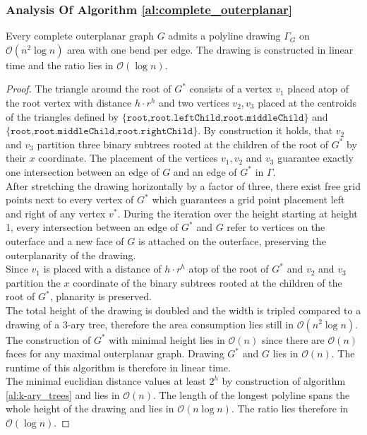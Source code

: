 
\subsubsection{Analysis Of Algorithm \ref{al:complete_outerplanar}}

\begin{lemma}
	Every complete outerplanar graph $G$ admits a polyline drawing $\Gamma_G$ on $\mathcal{O}(n^2 \log n)$ area with one bend per edge. The drawing is constructed in linear time and the ratio lies in $\mathcal{O}(\log n)$.
\end{lemma}

\begin{proof}
The triangle around the root of $G^*$ consists of a vertex $v_1$ placed atop of the root vertex with distance $h\cdot r^h$ and two vertices $v_2,v_3$ placed at the centroids of the triangles defined by $\{\texttt{root,root.leftChild,root.middleChild}\}$ and $\{\texttt{root,root.middleChild,root.rightChild}\}$. By construction it holds, that $v_2$ and $v_3$ partition three binary subtrees rooted at the children of the root of $G^*$ by their $x$ coordinate. The placement of the vertices $v_1,v_2$ and $v_3$ guarantee exactly one intersection between an edge of $G$ and an edge of $G^*$ in $\Gamma$.\\
After stretching the drawing horizontally by a factor of three, there exist free grid points next to every vertex of $G^*$ which guarantees a grid point placement left and right of any vertex $v^*$. During the iteration over the height starting at height 1, every intersection between an edge of $G^*$ and $G$ refer to vertices on the outerface and a new face of $G$ is attached on the outerface, preserving the outerplanarity of the drawing.\\
Since $v_1$ is placed with a distance of $h\cdot r^h$ atop of the root of $G^*$ and $v_2$ and $v_3$ partition the $x$ coordinate of the binary subtrees rooted at the children of the root of $G^*$, planarity is preserved.\\
The total height of the drawing is doubled and the width is tripled compared to a drawing of a $3$-ary tree, therefore the area consumption lies still in $\mathcal{O}(n^2 \log n)$.\\
The construction of $G^*$ with minimal height lies in $\mathcal{O}(n)$ since there are $\mathcal{O}(n)$ faces for any maximal outerplanar graph. Drawing $G^*$ and $G$ lies in $\mathcal{O}(n)$. The runtime of this algorithm is therefore in linear time.\\
The minimal euclidian distance values at least $2^h$ by construction of algorithm \ref{al:k-ary_trees} and lies in $\mathcal{O}(n)$. The length of the longest polyline spans the whole height of the drawing and lies in $\mathcal{O}(n \log n)$. The ratio lies therefore in $\mathcal{O}(\log n)$.
\end{proof}
